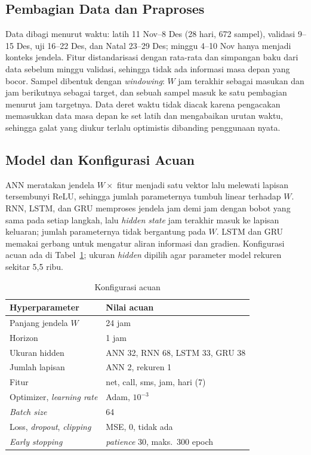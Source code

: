 \documentclass[conference,a4paper]{IEEEtran}
\begin{document}
\subsection{Pembagian Data dan Praproses}
Data dibagi menurut waktu: latih 11 Nov--8 Des (28 hari, 672 sampel), validasi 9--15 Des, uji 16--22 Des, dan Natal 23--29 Des; minggu 4--10 Nov hanya menjadi konteks jendela. Fitur distandarisasi dengan rata-rata dan simpangan baku dari data sebelum minggu validasi, sehingga tidak ada informasi masa depan yang bocor. Sampel dibentuk dengan \textit{windowing}: $W$ jam terakhir sebagai masukan dan jam berikutnya sebagai target, dan sebuah sampel masuk ke satu pembagian menurut jam targetnya. Data deret waktu tidak diacak karena pengacakan memasukkan data masa depan ke set latih dan mengabaikan urutan waktu, sehingga galat yang diukur terlalu optimistis dibanding penggunaan nyata.

\subsection{Model dan Konfigurasi Acuan}
ANN meratakan jendela $W \times$ fitur menjadi satu vektor lalu melewati lapisan tersembunyi ReLU, sehingga jumlah parameternya tumbuh linear terhadap $W$. RNN, LSTM, dan GRU memproses jendela jam demi jam dengan bobot yang sama pada setiap langkah, lalu \textit{hidden state} jam terakhir masuk ke lapisan keluaran; jumlah parameternya tidak bergantung pada $W$. LSTM dan GRU memakai gerbang untuk mengatur aliran informasi dan gradien. Konfigurasi acuan ada di Tabel~\ref{tab:acuan}; ukuran \textit{hidden} dipilih agar parameter model rekuren sekitar 5,5 ribu.

\begin{table}[t]
  \centering
  \caption{Konfigurasi acuan}
  \label{tab:acuan}
  \begin{tabular}{@{}ll@{}}
    \toprule
    Hyperparameter & Nilai acuan \\
    \midrule
    Panjang jendela $W$ & 24 jam \\
    Horizon & 1 jam \\
    Ukuran hidden & ANN 32, RNN 68, LSTM 33, GRU 38 \\
    Jumlah lapisan & ANN 2, rekuren 1 \\
    Fitur & net, call, sms, jam, hari (7) \\
    Optimizer, \textit{learning rate} & Adam, $10^{-3}$ \\
    \textit{Batch size} & 64 \\
    Loss, \textit{dropout}, \textit{clipping} & MSE, 0, tidak ada \\
    \textit{Early stopping} & \textit{patience} 30, maks.\ 300 epoch \\
    \bottomrule
  \end{tabular}
\end{table}
\end{document}
